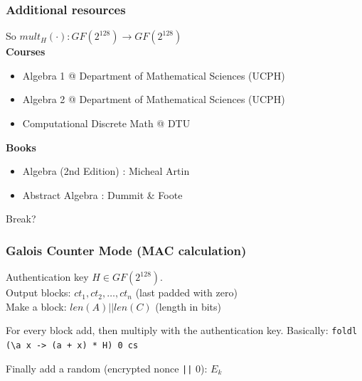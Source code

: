 \documentclass{beamer}
\begin{document}
\begin{frame}
\frametitle{Additional resources}
So $mult_{H}(\cdot) : GF(2^{128}) \to GF(2^{128})$ \\
\vspace{3mm}
\textbf{Courses}
\begin{itemize}
    \item Algebra 1 @ Department of Mathematical Sciences (UCPH)
    \item Algebra 2 @ Department of Mathematical Sciences (UCPH)
    \item Computational Discrete Math @ DTU
\end{itemize}
\textbf{Books}
\begin{itemize}
    \item Algebra (2nd Edition) : Micheal Artin
    \item Abstract Algebra : Dummit \& Foote
\end{itemize}
Break?
\end{frame}

\begin{frame}[fragile]
\frametitle{Galois Counter Mode (MAC calculation)}
Authentication key $H \in GF(2^{128})$. \\
Output blocks: $ct_{1}, ct_{2}, \ldots, ct_{n}$ (last padded with zero) \\
Make a block: $len(A) || len(C)$ (length in bits) \\

\vspace{3mm}

For every block add, then multiply with the authentication key.
Basically:
\texttt{foldl (\textbackslash a x -> (a + x) * H) 0 cs}

\vspace{3mm}

Finally add a random (encrypted nonce \verb!||! 0): $E_{k}$
\end{frame}
\end{document}
